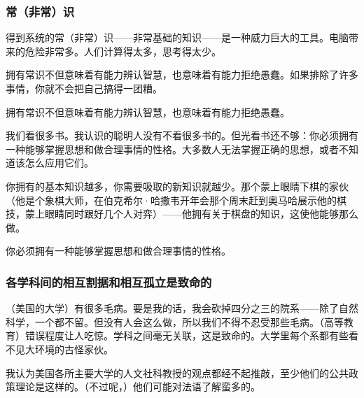 \subsubsection*{常（非常）识}

得到系统的常（非常）识——非常基础的知识——是一种威力巨大的工具。电脑带来的危险非常多。人们计算得太多，思考得太少。
\par

拥有常识不但意味着有能力辨认智慧，也意味着有能力拒绝愚蠢。如果排除了许多事情，你就不会把自己搞得一团糟。
\par

\begin{WisdomBox}
\par

拥有常识不但意味着有能力辨认智慧，也意味着有能力拒绝愚蠢。
\par
\end{WisdomBox}

我们看很多书。我认识的聪明人没有不看很多书的。但光看书还不够：你必须拥有一种能够掌握思想和做合理事情的性格。大多数人无法掌握正确的思想，或者不知道该怎么应用它们。
\par

你拥有的基本知识越多，你需要吸取的新知识就越少。那个蒙上眼睛下棋的家伙（他是个象棋大师，在伯克希尔·哈撒韦开年会那个周末赶到奥马哈展示他的棋技，蒙上眼睛同时跟好几个人对弈）——他拥有关于棋盘的知识，这使他能够那么做。
\par

\begin{WisdomBox}
\par

你必须拥有一种能够掌握思想和做合理事情的性格。
\par
\end{WisdomBox}

\subsubsection*{各学科间的相互割据和相互孤立是致命的}

（美国的大学）有很多毛病。要是我的话，我会砍掉四分之三的院系——除了自然科学，一个都不留。但没有人会这么做，所以我们不得不忍受那些毛病。（高等教育）错误程度让人吃惊。学科之间毫无关联，这是致命的。大学里每个系都有些看不见大环境的古怪家伙。
\par

我认为美国各所主要大学的人文社科教授的观点都经不起推敲，至少他们的公共政策理论是这样的。（不过呢，）他们可能对法语了解蛮多的。
\par

